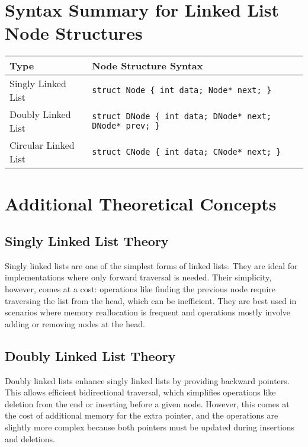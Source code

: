 \section{Syntax Summary for Linked List Node Structures}
\begin{center}
\renewcommand{\arraystretch}{1.5}
\begin{tabular}{|l|l|}
\hline
\textbf{Type} & \textbf{Node Structure Syntax} \\\hline
Singly Linked List & \texttt{struct Node \{ int data; Node* next; \}} \\\hline
Doubly Linked List & \texttt{struct DNode \{ int data; DNode* next; DNode* prev; \}} \\\hline
Circular Linked List & \texttt{struct CNode \{ int data; CNode* next; \}} \\\hline
\end{tabular}
\end{center}

\section{Additional Theoretical Concepts}

\subsection{Singly Linked List Theory}
Singly linked lists are one of the simplest forms of linked lists. They are ideal for implementations where only forward traversal is needed. Their simplicity, however, comes at a cost: operations like finding the previous node require traversing the list from the head, which can be inefficient. They are best used in scenarios where memory reallocation is frequent and operations mostly involve adding or removing nodes at the head.

\subsection{Doubly Linked List Theory}
Doubly linked lists enhance singly linked lists by providing backward pointers. This allows efficient bidirectional traversal, which simplifies operations like deletion from the end or inserting before a given node. However, this comes at the cost of additional memory for the extra pointer, and the operations are slightly more complex because both pointers must be updated during insertions and deletions.

